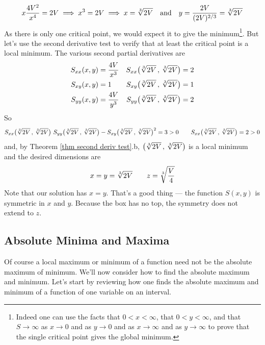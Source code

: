 \begin{eg}
\begin{equation*}
x\frac{4V^2}{x^4}=2V \implies
x^3 = 2V \implies  x = \root{3}\of{2V}\quad\text{and}\quad
                   y = \frac{2V}{(2V)^{2/3}} = \root{3}\of{2V}
\end{equation*}
As there is only one critical point, we would expect it to give the
minimum\footnote{Indeed one can use the facts that $0<x<\infty$, that
$0<y<\infty$, and that $S\rightarrow\infty$ as $x\rightarrow 0$ and
as $y\rightarrow 0$ and as $x\rightarrow \infty$ and as 
$y\rightarrow\infty$ to prove that the single critical point gives the
global minimum.}. But let's use the second derivative test to verify that
at least the critical point is a local minimum. The various second partial derivatives are
\begin{align*}
S_{xx}(x,y)&=\frac{4V}{x^3} &
    S_{xx}\big(\root{3}\of{2V}\,,\,\root{3}\of{2V}\big)&=2 \\
S_{xy}(x,y)&=1&
    S_{xy}\big(\root{3}\of{2V}\,,\,\root{3}\of{2V}\big)&=1 \\
S_{yy}(x,y)&=\frac{4V}{y^3} &
    S_{yy}\big(\root{3}\of{2V}\,,\,\root{3}\of{2V}\big)&=2 
\end{align*}
So
\begin{align*}
S_{xx}\big(\root{3}\of{2V}\,,\,\root{3}\of{2V}\big)\ 
S_{yy}\big(\root{3}\of{2V}\,,\,\root{3}\of{2V}\big)
-S_{xy}\big(\root{3}\of{2V}\,,\,\root{3}\of{2V}\big)^2
=3>0\qquad
S_{xx}\big(\root{3}\of{2V}\,,\,\root{3}\of{2V}\big)=2>0
\end{align*}
and, by Theorem \ref{thm second deriv test}.b,
$\big(\root{3}\of{2V}\,,\,\root{3}\of{2V}\big)$ is a local 
minimum and the desired dimensions are
\begin{equation*}
x=y=\root{3}\of{2V}\qquad
z=\root{3}\of{\frac{V}{4}}
\end{equation*}
Note that our solution has $x=y$. That's a good thing --- the
function $S(x,y)$ is symmetric in $x$ and $y$. Because the box has
no top, the symmetry does not extend to $z$.
\end{eg} 



\subsection{Absolute Minima and Maxima}\label{sec global}


Of course a local maximum or minimum of a function need not be the 
absolute maximum of minimum. We'll now consider how to find the 
absolute maximum and minimum.
Let's start by reviewing how one finds the absolute maximum and minimum 
of a function of one variable on an interval. 

